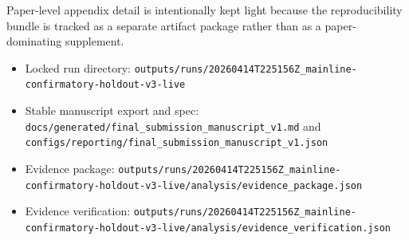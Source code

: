 \documentclass{article}
\providecommand{\tightlist}{%
  \setlength{\itemsep}{0pt}\setlength{\parskip}{0pt}}
\begin{document}
Paper-level appendix detail is intentionally kept light because the reproducibility bundle is tracked as a separate artifact package rather than as a paper-dominating supplement.

\begin{itemize}
\tightlist
\item
  Locked run directory: \texttt{outputs/runs/20260414T225156Z\_mainline-confirmatory-holdout-v3-live}
\item
  Stable manuscript export and spec: \texttt{docs/generated/final\_submission\_manuscript\_v1.md} and \texttt{configs/reporting/final\_submission\_manuscript\_v1.json}
\item
  Evidence package: \texttt{outputs/runs/20260414T225156Z\_mainline-confirmatory-holdout-v3-live/analysis/evidence\_package.json}
\item
  Evidence verification: \texttt{outputs/runs/20260414T225156Z\_mainline-confirmatory-holdout-v3-live/analysis/evidence\_verification.json}
\end{itemize}
\end{document}
